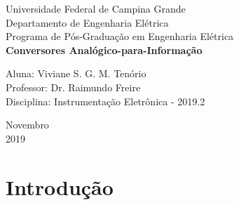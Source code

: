 \documentclass[a4paper, 12pt]{article}
\begin{document}

\begin{titlepage}
	\begin{center}
	

		\LARGE{Universidade Federal de Campina Grande}\\
		\large{Departamento de Engenharia Elétrica}\\ 
		\large{Programa de Pós-Graduação em Engenharia Elétrica}\\ 
		\vspace{15pt}
        \vspace{95pt}
        \textbf{\LARGE{Conversores Analógico-para-Informação}}\\
		\vspace{3,5cm}
	\end{center}
	
	\begin{flushleft}
		\begin{tabbing}
			Aluna: Viviane S. G. M. Tenório\\
			Professor: Dr. Raimundo Freire\\
			Disciplina: Instrumentação Eletrônica - 2019.2\\
	\end{tabbing}
 \end{flushleft}
	\vspace{1cm}
	
	\begin{center}
		\vspace{\fill}
			 Novembro\\
		 2019
			\end{center}
\end{titlepage}



\newpage
\tableofcontents
\thispagestyle{empty}

\newpage
{}

\section{Introdução}
\end{document}
